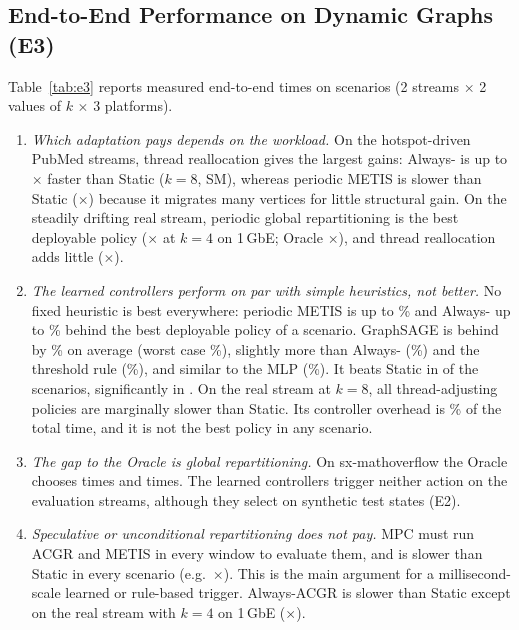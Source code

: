 \subsection{End-to-End Performance on Dynamic Graphs (E3)}
Table~\ref{tab:e3} reports measured end-to-end times on \NumScenarios{} scenarios
(2 streams $\times$ 2 values of $k$ $\times$ 3 platforms).
\begin{enumerate}
  \item \emph{Which adaptation pays depends on the workload.} On the hotspot-driven PubMed
        streams, thread reallocation gives the largest gains: Always-\TA{} is up to
        \SpPubEightSmAlwaysTA$\times$ faster than Static ($k=8$, SM), whereas periodic METIS is
        slower than Static (\SpPubEightSmPMETIS$\times$) because it migrates many vertices for
        little structural gain. On the steadily drifting real stream, periodic global
        repartitioning is the best deployable policy (\SpMathFourOnePMETIS$\times$ at $k=4$ on
        1\,GbE; Oracle \SpMathFourOneOracle$\times$), and thread reallocation adds little
        (\SpMathFourOneAlwaysTA$\times$).
  \item \emph{The learned controllers perform on par with simple heuristics, not better.}
        No fixed heuristic is best everywhere: periodic METIS is up to \RobPMETISMax\% and
        Always-\TA{} up to \RobAlwaysTAMax\% behind the best deployable policy of a scenario.
        GraphSAGE is behind by \RobGSAGEMean\% on average (worst case \RobGSAGEMax\%), slightly
        more than Always-\TA{} (\RobAlwaysTAMean\%) and the threshold rule
        (\RobThresholdMean\%), and similar to the MLP (\RobMLPMean\%). It beats Static in
        \FasterGSAGE{} of the \NumScenarios{} scenarios, significantly in \SigFasterGSAGE{}. On
        the real stream at $k=8$, all thread-adjusting policies are marginally slower than
        Static. Its controller overhead is \CtrlGSAGE\% of the total time, and it is not the
        best policy in any scenario.
  \item \emph{The gap to the Oracle is global repartitioning.} On sx-mathoverflow the Oracle
        chooses \RB{} \MathRBOracle{} times and \RP{} \MathRPOracle{} times. The learned
        controllers trigger neither action on the evaluation streams, although they select \RB{}
        on synthetic test states (E2).
  \item \emph{Speculative or unconditional repartitioning does not pay.} MPC must run ACGR and
        METIS in every window to evaluate them, and is slower than Static in every scenario
        (e.g.\ \SpPubEightSmMPC$\times$). This is the main argument for a millisecond-scale
        learned or rule-based trigger. Always-ACGR is slower than Static except on the real
        stream with $k=4$ on 1\,GbE (\SpMathFourOneAlwaysACGR$\times$).
\end{enumerate}

